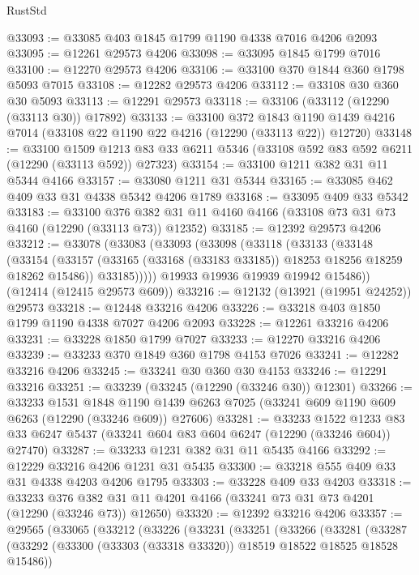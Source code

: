 \begin{lexlean}{RustStd}
\begin{coremodule}
@33093 := @33085 @403 @1845 @1799 @1190 @4338 @7016 @4206 @2093
@33095 := @12261 @29573 @4206
@33098 := @33095 @1845 @1799 @7016
@33100 := @12270 @29573 @4206
@33106 := @33100 @370 @1844 @360 @1798 @5093 @7015
@33108 := @12282 @29573 @4206
@33112 := @33108 @30 @360 @30 @5093
@33113 := @12291 @29573
@33118 := @33106 (@33112 (@12290 (@33113 @30)) @17892)
@33133 := @33100
    @372
    @1843
    @1190
    @1439
    @4216
    @7014
    (@33108 @22 @1190 @22 @4216 (@12290 (@33113 @22)) @12720)
@33148 := @33100
    @1509
    @1213
    @83
    @33
    @6211
    @5346
    (@33108 @592 @83 @592 @6211 (@12290 (@33113 @592)) @27323)
@33154 := @33100 @1211 @382 @31 @11 @5344 @4166
@33157 := @33080 @1211 @31 @5344
@33165 := @33085 @462 @409 @33 @31 @4338 @5342 @4206 @1789
@33168 := @33095 @409 @33 @5342
@33183 := @33100
    @376
    @382
    @31
    @11
    @4160
    @4166
    (@33108 @73 @31 @73 @4160 (@12290 (@33113 @73)) @12352)
@33185 := @12392 @29573 @4206
@33212 := @33078
    (@33083
      (@33093
        (@33098
          (@33118
            (@33133
              (@33148
                (@33154
                  (@33157 (@33165 (@33168 (@33183 @33185)) @18253 @18256 @18259 @18262 @15486))
                  @33185)))))
        @19933
        @19936
        @19939
        @19942
        @15486))
    (@12414 (@12415 @29573 @609))
@33216 := @12132 (@13921 (@19951 @24252)) @29573
@33218 := @12448 @33216 @4206
@33226 := @33218 @403 @1850 @1799 @1190 @4338 @7027 @4206 @2093
@33228 := @12261 @33216 @4206
@33231 := @33228 @1850 @1799 @7027
@33233 := @12270 @33216 @4206
@33239 := @33233 @370 @1849 @360 @1798 @4153 @7026
@33241 := @12282 @33216 @4206
@33245 := @33241 @30 @360 @30 @4153
@33246 := @12291 @33216
@33251 := @33239 (@33245 (@12290 (@33246 @30)) @12301)
@33266 := @33233
    @1531
    @1848
    @1190
    @1439
    @6263
    @7025
    (@33241 @609 @1190 @609 @6263 (@12290 (@33246 @609)) @27606)
@33281 := @33233
    @1522
    @1233
    @83
    @33
    @6247
    @5437
    (@33241 @604 @83 @604 @6247 (@12290 (@33246 @604)) @27470)
@33287 := @33233 @1231 @382 @31 @11 @5435 @4166
@33292 := @12229 @33216 @4206 @1231 @31 @5435
@33300 := @33218 @555 @409 @33 @31 @4338 @4203 @4206 @1795
@33303 := @33228 @409 @33 @4203
@33318 := @33233
    @376
    @382
    @31
    @11
    @4201
    @4166
    (@33241 @73 @31 @73 @4201 (@12290 (@33246 @73)) @12650)
@33320 := @12392 @33216 @4206
@33357 := @29565
    (@33065
      (@33212
        (@33226
          (@33231
            (@33251
              (@33266
                (@33281
                  (@33287
                    (@33292 (@33300 (@33303 (@33318 @33320)) @18519 @18522 @18525 @18528 @15486))

\end{coremodule}
\end{lexlean}
